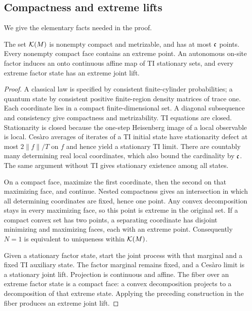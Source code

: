 \subsection{Compactness and extreme lifts}
We give the elementary facts needed in the proof.
\begin{lemma}\label{lem:compact}
The set $\mathcal K(M)$ is nonempty compact and metrizable, and has at most $\mathfrak c$ points. Every nonempty compact face contains an extreme point. An autonomous on-site factor induces an onto continuous affine map of TI stationary sets, and every extreme factor state has an extreme joint lift.
\end{lemma}
\begin{proof}
A classical law is specified by consistent finite-cylinder probabilities; a quantum state by consistent positive finite-region density matrices of trace one. Each coordinate lies in a compact finite-dimensional set. A diagonal subsequence and consistency give compactness and metrizability. TI equations are closed. Stationarity is closed because the one-step Heisenberg image of a local observable is local. Ces\`aro averages of iterates of a TI initial state have stationarity defect at most $2\|f\|/T$ on $f$ and hence yield a stationary TI limit. There are countably many determining real local coordinates, which also bound the cardinality by $\mathfrak c$. The same argument without TI gives stationary existence among all states.

On a compact face, maximize the first coordinate, then the second on that maximizing face, and continue. Nested compactness gives an intersection in which all determining coordinates are fixed, hence one point. Any convex decomposition stays in every maximizing face, so this point is extreme in the original set. If a compact convex set has two points, a separating coordinate has disjoint minimizing and maximizing faces, each with an extreme point. Consequently $N=1$ is equivalent to uniqueness within $\mathcal K(M)$.

Given a stationary factor state, start the joint process with that marginal and a fixed TI auxiliary state. The factor marginal remains fixed, and a Ces\`aro limit is a stationary joint lift. Projection is continuous and affine. The fiber over an extreme factor state is a compact face: a convex decomposition projects to a decomposition of that extreme state. Applying the preceding construction in the fiber produces an extreme joint lift.
\end{proof}

